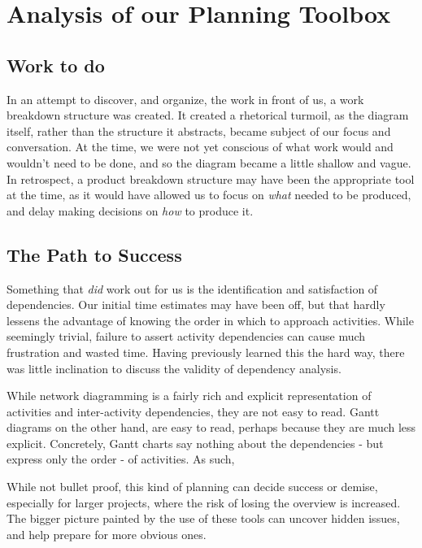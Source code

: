 \section{Analysis of our Planning Toolbox}
\subsection{Work to do}
In an attempt to discover, and organize, the work in front of us, a work
breakdown structure was created. It created a rhetorical turmoil, as the
diagram itself, rather than the structure it abstracts, became subject of our
focus and conversation. At the time, we were not yet conscious of what work
would and wouldn't need to be done, and so the diagram became a little shallow
and vague. In retrospect, a product breakdown structure may have been the
appropriate tool at the time, as it would have allowed us to focus on
\emph{what} needed to be produced, and delay making decisions on \emph{how} to
produce it\cite[ch.~8.3,~8.4]{caye}.

\subsection{The Path to Success}
Something that \emph{did} work out for us is the identification and satisfaction
of dependencies. Our initial time estimates may have been off, but that hardly
lessens the advantage of knowing the order in which to approach activities.
While seemingly trivial, failure to assert activity dependencies can cause much
frustration and wasted time. Having previously learned this the hard way, there
was little inclination to discuss the validity of dependency analysis.

While network diagramming is a fairly rich and explicit representation of
activities and inter-activity dependencies, they are not easy to read.
Gantt diagrams on the other hand, are easy to read, perhaps because they are
much less explicit. Concretely, Gantt charts say nothing about the dependencies
- but express only the order - of activities. As such, 
\cite[ch.~8.6]{caye}

While not bullet proof, this kind of planning can decide success or
demise\cite[ch.~8]{caye}, especially for larger projects, where the risk of
losing the overview is increased. The bigger picture painted by the use of
these tools can uncover hidden issues, and help prepare for more obvious ones.
